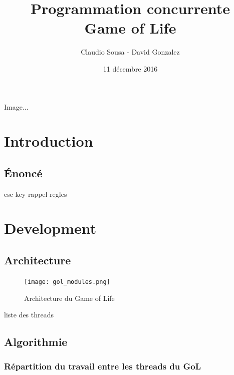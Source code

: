 \documentclass[11pt, a4paper]{article}
\begin{document}
\title
{
    \Huge{Programmation concurrente} \\
    \Huge{Game of Life}
}
\author
{
    \LARGE{Claudio Sousa - David Gonzalez}
}
\date{11 décembre 2016}
\maketitle

\begin{center}
    Image...%
\end{center}

\thispagestyle{empty}

\newpage

\section{Introduction}
\subsection{Énoncé}

esc key
rappel regles

\newpage

\section{Development}
\subsection{Architecture}

\begin{figure}[H]
    \begin{center}
        \texttt{[image: gol\_modules.png]}
    \end{center}
    \caption{Architecture du Game of Life}
    \label{Architecture du Game of Life}
\end{figure}

liste des threads

\subsection{Algorithmie}

\subsubsection{Répartition du travail entre les threads du GoL}
\end{document}
